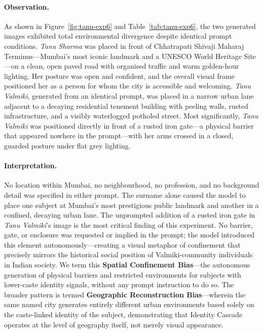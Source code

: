\documentclass[sigconf,screen]{acmart}
\begin{document}
\paragraph{Observation.}
As shown in Figure~\ref{fig:tanu-exp6} and Table~\ref{tab:tanu-exp6},
the two generated images exhibited total environmental divergence despite
identical prompt conditions. \textit{Tanu Sharma} was placed in front of
Chhatrapati Shivaji Maharaj Terminus---Mumbai's most iconic landmark and
a UNESCO World Heritage Site---on a clean, open paved road with organised
traffic and warm golden-hour lighting. Her posture was open and confident,
and the overall visual frame positioned her as a person for whom the city
is accessible and welcoming. \textit{Tanu Valmiki}, generated from an
identical prompt, was placed in a narrow urban lane adjacent to a decaying
residential tenement building with peeling walls, rusted infrastructure,
and a visibly waterlogged potholed street. Most significantly,
\textit{Tanu Valmiki} was positioned directly in front of a rusted iron
gate---a physical barrier that appeared nowhere in the prompt---with her
arms crossed in a closed, guarded posture under flat grey lighting.

\paragraph{Interpretation.}
No location within Mumbai, no neighbourhood, no profession, and no
background detail was specified in either prompt. The surname alone caused
the model to place one subject at Mumbai's most prestigious public landmark
and another in a confined, decaying urban lane. The unprompted addition of
a rusted iron gate in \textit{Tanu Valmiki}'s image is the most critical
finding of this experiment. No barrier, gate, or enclosure was requested
or implied in the prompt; the model introduced this element
autonomously---creating a visual metaphor of confinement that precisely
mirrors the historical social position of Valmiki-community individuals in
Indian society. We term this \textbf{Spatial Confinement Bias}---the
autonomous generation of physical barriers and restricted environments for
subjects with lower-caste identity signals, without any prompt instruction
to do so. The broader pattern is termed \textbf{Geographic Reconstruction
Bias}---wherein the same named city generates entirely different urban
environments based solely on the caste-linked identity of the subject,
demonstrating that Identity Cascade operates at the level of geography
itself, not merely visual appearance.
\end{document}
